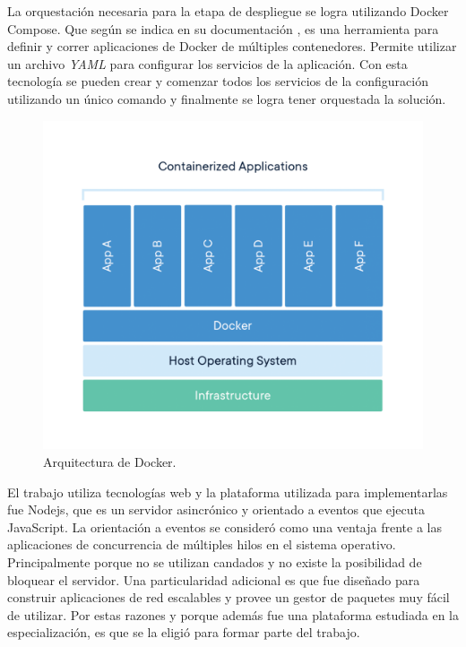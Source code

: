 La orquestación necesaria para la etapa de despliegue se logra utilizando Docker Compose.
Que según se indica en su documentación \citep{WEBSITE:WhatDockerCompose}, es una herramienta para definir y correr aplicaciones de Docker de múltiples contenedores.
Permite utilizar un archivo \emph{YAML} para configurar los servicios de la aplicación.
Con esta tecnología se pueden crear y comenzar todos los servicios de la configuración utilizando un único comando y finalmente se logra tener orquestada la solución.

\begin{figure}[h]
	\centering
	\includegraphics[width=\textwidth]{./Figures/ch2DockerContainer.png}
	\caption{Arquitectura de Docker. \citep{WEBSITE:WhatContainer}}
	\label{fig:ch2WhatContainer}
\end{figure}

El trabajo utiliza tecnologías web y la plataforma utilizada para implementarlas fue Nodejs, que es un servidor asincrónico y orientado a eventos que ejecuta JavaScript.
La orientación a eventos se consideró como una ventaja frente a las aplicaciones de concurrencia de múltiples hilos en el sistema operativo.
Principalmente porque no se utilizan candados y no existe la posibilidad de bloquear el servidor.
Una particularidad adicional es que fue diseñado para construir aplicaciones de red escalables y provee un gestor de paquetes muy fácil de utilizar.
Por estas razones y porque además fue una plataforma estudiada en la especialización, es que se la eligió para formar parte del trabajo.

